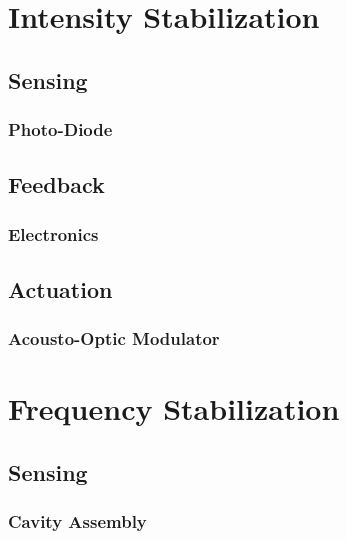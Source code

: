 \section{Intensity Stabilization}

\subsection{Sensing}
\subsubsection{Photo-Diode}

\subsection{Feedback}
\subsubsection{Electronics}

\subsection{Actuation}
\subsubsection{Acousto-Optic Modulator}


\section{Frequency Stabilization}

\subsection{Sensing}
\subsubsection{Cavity Assembly}
